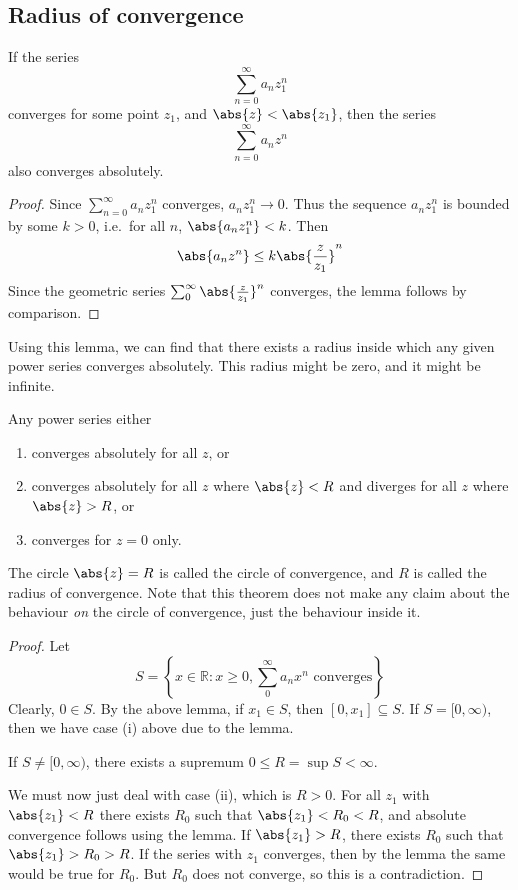 \subsection{Radius of convergence}
\begin{lemma}
	If the series
	\[
		\sum_{n=0}^\infty a_n z_1^n
	\]
	converges for some point \(z_1\), and \(\abs{z} < \abs{z_1}\), then the series
	\[
		\sum_{n=0}^\infty a_n z^n
	\]
	also converges absolutely.
\end{lemma}
\begin{proof}
	Since \(\sum_{n=0}^\infty a_n z_1^n\) converges, \(a_n z_1^n \to 0\).
	Thus the sequence \(a_n z_1^n\) is bounded by some \(k > 0\), i.e.\ for all \(n\), \(\abs{a_n z_1^n}<k\).
	Then
	\[
		\abs{a_n z^n} \leq k\abs{\frac{z}{z_1}}^n
	\]
	Since the geometric series \(\sum_0^\infty \abs{\frac{z}{z_1}}^n\) converges, the lemma follows by comparison.
\end{proof}
Using this lemma, we can find that there exists a radius inside which any given power series converges absolutely.
This radius might be zero, and it might be infinite.
\begin{theorem}
	Any power series either
	\begin{enumerate}
		\item converges absolutely for all \(z\), or
		\item converges absolutely for all \(z\) where \(\abs{z} < R\) and diverges for all \(z\) where \(\abs{z} > R\), or
		\item converges for \(z = 0\) only.
	\end{enumerate}
\end{theorem}
The circle \(\abs{z} = R\) is called the circle of convergence, and \(R\) is called the radius of convergence.
Note that this theorem does not make any claim about the behaviour \textit{on} the circle of convergence, just the behaviour inside it.
\begin{proof}
	Let
	\[
		S = \left\{ x \in \mathbb R \colon x \geq 0, \sum_0^\infty a_n x^n \text{ converges} \right\}
	\]
	Clearly, \(0 \in S\).
	By the above lemma, if \(x_1 \in S\), then \([0, x_1] \subseteq S\).
	If \(S = [0, \infty)\), then we have case (i) above due to the lemma.

	If \(S \neq [0, \infty)\), there exists a supremum \(0 \leq R = \sup S < \infty\).

	We must now just deal with case (ii), which is \(R > 0\).
	For all \(z_1\) with \(\abs{z_1} < R\) there exists \(R_0\) such that \(\abs{z_1} < R_0 < R\), and absolute convergence follows using the lemma.
	If \(\abs{z_1} > R\), there exists \(R_0\) such that \(\abs{z_1} > R_0 > R\).
	If the series with \(z_1\) converges, then by the lemma the same would be true for \(R_0\).
	But \(R_0\) does not converge, so this is a contradiction.
\end{proof}

